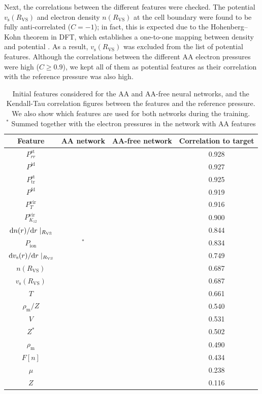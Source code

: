 \documentclass[%
 preprint,
 superscriptaddress,
 amsmath,amssymb,
longbibliography,
]{revtex4-2}
\newcommand{\RWS}{R_\textrm{VS}}
\newcommand{\cmark}{\ding{51}}%
\newcommand{\xmark}{\ding{55}}%
\newcommand{\Pfd}{P^\textrm{fd}}
\newcommand{\Pstrr}{P^\textrm{st}_{rr}}
\newcommand{\Psttr}{P^\textrm{st}_\textrm{tr}}
\newcommand{\Pvirt}{P^\textrm{vir}_T}
\newcommand{\Pvirk}{P^\textrm{vir}_{K_{12}}}
\newcommand{\Pid}{P^\textrm{id}}
\begin{document}
Next, the correlations between the different features were checked. The potential $v_\textrm{s}(\RWS)$ and electron density $n(\RWS)$ at the cell boundary were found to be fully anti-correlated ($C=-1$); in fact, this is expected due to the Hohenberg--Kohn theorem in DFT, which establishes a one-to-one mapping between density and potential \cite{hk64}. As a result, $v_\textrm{s}(\RWS)$ was excluded from the list of potential features. Although the correlations between the different AA electron pressures were high ($C\geq 0.9$), we kept all of them as potential features as their correlation with the reference pressure was also high.

\begin{table}[]
\begin{tabular}{cccc}
    \toprule
     Feature & AA network & AA-free network & Correlation to target \\
     \midrule
     $\Pstrr$ & \cmark & \xmark & 0.928 \\
     $\Pid$ & \cmark & \xmark & 0.927 \\
     $\Psttr$ & \cmark & \xmark & 0.925 \\
     $\Pfd$ & \cmark & \xmark & 0.919 \\
     $\Pvirt$ & \cmark & \xmark & 0.916 \\      
     $\Pvirk$ & \cmark & \xmark & 0.900 \\         
     $\dv*{n(r)}{r}|_{\RWS}$ & \cmark & \xmark & 0.844 \\
     $P_\textrm{ion}$ & \cmark$^*$ & \cmark & 0.834 \\
     $\dv*{v_\textrm{s}(r)}{r}|_{\RWS}$ & \cmark & \xmark & 0.749 \\
     ${n(\RWS)}$ & \cmark & \xmark & 0.687 \\
     ${v_\textrm{s}(\RWS)}$ & \xmark & \xmark & 0.687 \\
     $T$ & \cmark & \cmark & 0.661 \\
     $\rho_\textrm{m}/Z$ & \cmark & \cmark & 0.540 \\
     $V$ & \cmark & \cmark & 0.531 \\
     $Z^*$ & \cmark & \xmark & 0.502 \\
     $\rho_\textrm{m}$ & \cmark & \cmark & 0.490 \\
     $F[n]$ & \xmark & \xmark & 0.434  \\ 
     $\mu$ & \xmark & \xmark & 0.238 \\
     $Z$ & \xmark & \xmark & 0.116 \\
     \bottomrule
\end{tabular}
    \caption{Initial features considered for the AA and AA-free neural networks, and the Kendall-Tau correlation figures between the features and the reference pressure. We also show which features are used for both networks during the training.\\
    $^*$ \footnotesize{Summed together with the electron pressures in the network with AA features}}
    \label{tab:init_features}
\end{table}
\end{document}
